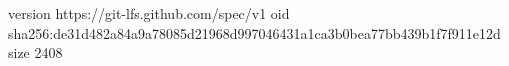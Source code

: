 version https://git-lfs.github.com/spec/v1
oid sha256:de31d482a84a9a78085d21968d997046431a1ca3b0bea77bb439b1f7f911e12d
size 2408
